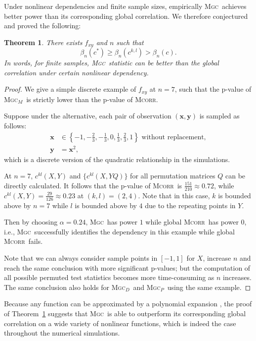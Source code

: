 \documentclass[11pt]{article}
\providecommand{\sct}[1]{{\normalfont\textsc{#1}}}
\providecommand{\mb}[1]{\boldsymbol{#1}}
\newcommand{\GG}{c}
\newcommand{\Mgc}{\sct{Mgc}}
\newcommand{\Mgcp}{\sct{Mgc$_P$}}
\newcommand{\Mgcd}{\sct{Mgc$_D$}}
\newcommand{\Mgcm}{\sct{Mgc$_M$}}
\newcommand{\Dcorr}{\sct{Dcorr}}
\newcommand{\Mcorr}{\sct{Mcorr}}
\newtheorem{thm}{Theorem}
\begin{document}
Under nonlinear dependencies and finite sample sizes, empirically \Mgc~achieves better power than its corresponding global correlation. 
We therefore conjectured and proved the following:
\begin{thm}
\label{t:non}
There exists $f_{xy}$ and $n$ such that
\begin{equation}
\beta_n(\GG^*) \geq \beta_n(\GG^{k,l}) > \beta_n(\GG).
\end{equation}
In words, for finite samples, \Mgc~statistic can be better than the global correlation under certain nonlinear dependency.
\end{thm}
\begin{proof}
We give a simple discrete example of $f_{xy}$ at $n=7$, such that the p-value of \Mgcm~is strictly lower than the p-value of \Mcorr.

Suppose under the alternative, each pair of observation $(\mb{x},\mb{y})$ is sampled as follows:
\begin{align*}
\mb{x} &\in \left\{-1,-\frac{2}{3},-\frac{1}{3},0,\frac{1}{3},\frac{2}{3},1\right\} \mbox{ without replacement}, \\
\mb{y} &= \mb{x}^2,
\end{align*}
which is a discrete version of the quadratic relationship in the simulations.

At $n=7$, $\GG^{kl}(X, Y)$ and $\{\GG^{kl}(X, YQ)\}$ for all permutation matrices $Q$ can be directly calculated. It follows that the p-value of \Mcorr~is $\frac{151}{210} \approx 0.72$, while $\GG^{kl}(X, Y)=\frac{29}{126} \approx 0.23$ at $(k,l)=(2,4)$. Note that in this case, $k$ is bounded above by $n=7$ while $l$ is bounded above by $4$ due to the repeating points in $Y$. 

Then by choosing $\alpha = 0.24$, \Mgc~has power $1$ while global \Mcorr~has power $0$, i.e., \Mgc~successfully identifies the dependency in this example while global \Mcorr~fails.

Note that we can always consider sample points in $[-1,1]$ for $X$, increase $n$ and reach the same conclusion with more significant p-values; but the computation of all possible permuted test statistics becomes more time-consuming as $n$ increases. The same conclusion also holds for \Mgcd~and \Mgcp~using the same example.
\end{proof}


Because any function can be approximated by a polynomial expansion \cite{RudinBook}, the proof of Theorem~\ref{t:non} suggests that \Mgc~is able to outperform its corresponding global correlation on a wide variety of nonlinear functions, which is indeed the case throughout the numerical simulations. 
\end{document}
